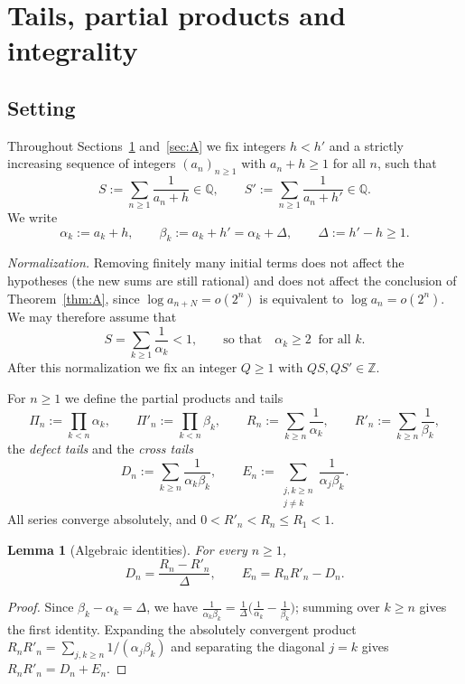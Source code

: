\documentclass[11pt]{amsart}
\newtheorem{lemma}{Lemma}[section]
\theoremstyle{definition}
\theoremstyle{remark}
\newcommand{\Z}{\mathbb{Z}}
\newcommand{\Q}{\mathbb{Q}}
\begin{document}
\section{Tails, partial products and integrality}\label{sec:lemmas}

\subsection{Setting}\label{subsec:setting}
Throughout Sections~\ref{sec:lemmas} and~\ref{sec:A} we fix integers $h<h'$ and a
strictly increasing sequence of integers $(a_n)_{n\ge1}$ with $a_n+h\ge1$ for all $n$,
such that
\[
S:=\sum_{n\ge1}\frac{1}{a_n+h}\in\Q,\qquad S':=\sum_{n\ge1}\frac1{a_n+h'}\in\Q .
\]
We write
\[
\alpha_k:=a_k+h,\qquad \beta_k:=a_k+h'=\alpha_k+\Delta,\qquad \Delta:=h'-h\ge1 .
\]

\emph{Normalization.} Removing finitely many initial terms does not affect the
hypotheses (the new sums are still rational) and does not affect the conclusion of
Theorem~\ref{thm:A}, since $\log a_{n+N}=o(2^{n})$ is equivalent to $\log a_n=o(2^n)$.
We may therefore assume that
\begin{equation}\label{eq:normal}
S=\sum_{k\ge1}\frac1{\alpha_k}<1,\qquad\text{so that}\quad \alpha_k\ge2\ \text{ for all }k.
\end{equation}
After this normalization we fix an integer $Q\ge1$ with $QS,QS'\in\Z$.

For $n\ge1$ we define the partial products and tails
\[
\Pi_n:=\prod_{k<n}\alpha_k,\qquad \Pi'_n:=\prod_{k<n}\beta_k,\qquad
R_n:=\sum_{k\ge n}\frac1{\alpha_k},\qquad R'_n:=\sum_{k\ge n}\frac1{\beta_k},
\]
the \emph{defect tails} and the \emph{cross tails}
\[
D_n:=\sum_{k\ge n}\frac{1}{\alpha_k\beta_k},\qquad
E_n:=\sum_{\substack{j,k\ge n\\ j\neq k}}\frac1{\alpha_j\beta_k}.
\]
All series converge absolutely, and $0<R'_n<R_n\le R_1<1$.

\begin{lemma}[Algebraic identities]\label{lem:identities}
For every $n\ge1$,
\[
D_n=\frac{R_n-R'_n}{\Delta},\qquad E_n=R_nR'_n-D_n .
\]
\end{lemma}

\begin{proof}
Since $\beta_k-\alpha_k=\Delta$, we have $\frac{1}{\alpha_k\beta_k}=
\frac1\Delta\bigl(\frac1{\alpha_k}-\frac1{\beta_k}\bigr)$; summing over $k\ge n$ gives the
first identity. Expanding the absolutely convergent product
$R_nR'_n=\sum_{j,k\ge n}1/(\alpha_j\beta_k)$ and separating the diagonal $j=k$ gives
$R_nR'_n=D_n+E_n$.
\end{proof}
\end{document}
